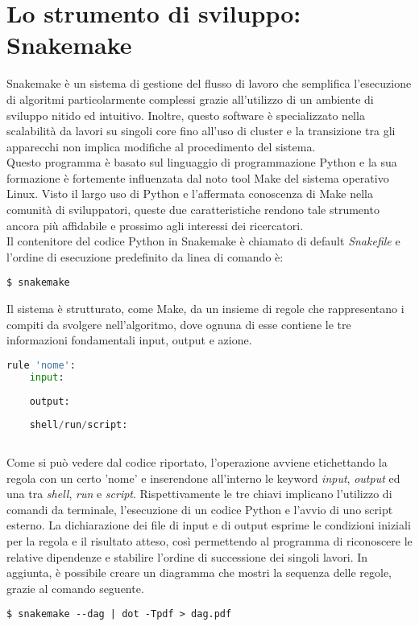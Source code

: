 \section{Lo strumento di sviluppo: Snakemake}
Snakemake è un sistema di gestione del flusso di lavoro che semplifica l'esecuzione di algoritmi particolarmente complessi grazie all'utilizzo di un ambiente di sviluppo nitido ed intuitivo. Inoltre, questo software è specializzato nella scalabilità da lavori su singoli core fino all'uso di cluster e la transizione tra gli apparecchi non implica modifiche al procedimento del sistema. \\
Questo programma è basato sul linguaggio di programmazione Python e la sua formazione è fortemente influenzata dal noto tool Make del sistema operativo Linux. Visto il largo uso di Python e l'affermata conoscenza di Make nella comunità di sviluppatori, queste due caratteristiche rendono tale strumento ancora più affidabile e prossimo agli interessi dei ricercatori. \\
Il contenitore del codice Python in Snakemake è chiamato di default \textit{Snakefile} e l'ordine di esecuzione predefinito da linea di comando è: 
\begin{lstlisting}
$ snakemake
\end{lstlisting}
Il sistema è strutturato, come Make, da un insieme di regole che rappresentano i compiti da svolgere nell'algoritmo, dove ognuna di esse contiene le tre informazioni fondamentali input, output e azione.
\begin{lstlisting}[language=Python]
rule 'nome':
	input:
	
	output:
	
	shell/run/script:
	
\end{lstlisting}
Come si può vedere dal codice riportato, l'operazione avviene etichettando la regola con un certo 'nome' e inserendone all'interno le keyword \textit{input}, \textit{output} ed una tra \textit{shell}, \textit{run} e \textit{script}. Rispettivamente le tre chiavi implicano l'utilizzo di comandi da terminale, l'esecuzione di un codice Python e l'avvio di uno script esterno. La dichiarazione dei file di input e di output esprime le condizioni iniziali per la regola e il risultato atteso, così permettendo al programma di riconoscere le relative dipendenze e stabilire l'ordine di successione dei singoli lavori. In aggiunta, è possibile creare un diagramma che mostri la sequenza delle regole, grazie al comando seguente.
\begin{lstlisting}
$ snakemake --dag | dot -Tpdf > dag.pdf
\end{lstlisting}
